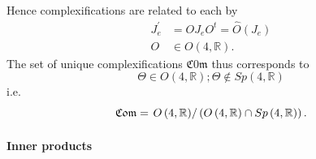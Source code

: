 \documentclass[aps,preprint]{revtex4}%
\begin{document}
Hence complexifications are related to each by
\begin{align}
J_{e}^{\prime}  &  =OJ_{e}O^{t}=\widehat{O}\left(  J_{e}\right) \\
O  &  \in O\left(  4,\mathbb{R}\right)  .
\end{align}
The set of unique complexifications $\mathfrak{C0m}$ thus corresponds to
\begin{equation}
\Theta\in O\left(  4,\mathbb{R}\right)  ;\Theta\notin Sp\left(  4,\mathbb{R}%
\right)
\end{equation}
i.e.
\begin{equation}
\mathfrak{C0m}=\left.  O\left(  4,\mathbb{R}\right)  \right/  \left(  O\left(
4,\mathbb{R}\right)  \cap Sp\left(  4,\mathbb{R}\right)  \right)  .
\end{equation}


\paragraph{Inner products}
\end{document}
